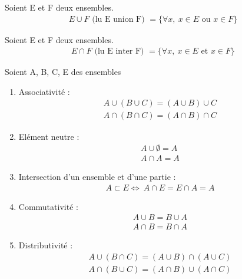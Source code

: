 \begin{graybox}
	\begin{definition}
		Soient E et F deux ensembles.
		\begin{align*}
			E \cup F \text{ (lu E union F) } = \{\forall x,\ x \in E \text{ ou } x \in F \}
		\end{align*}
	\end{definition}
\end{graybox}

\begin{graybox}
	\begin{definition}
		Soient E et F deux ensembles.
		\begin{align*}
			E \cap F \text{ (lu E inter F) } = \{\forall x,\ x \in E \text{ et } x \in F \}
		\end{align*}
	\end{definition}
\end{graybox}

\begin{graybox}
	\begin{proposition} Soient A, B, C, E des ensembles
		\begin{enumerate}
			\item Associativité :
			\begin{align*}
				A \cup (B \cup C) = (A \cup B) \cup C \\
				A \cap (B \cap C) = (A \cap B) \cap C
			\end{align*}
			\item Elément neutre : 
			\begin{align*}
				A \cup \emptyset = A \\
				A \cap A = A 
			\end{align*}
			\item Intersection d'un ensemble et d'une partie :
			\begin{align*}
				A \subset E \iff \ A \cap E = E \cap A = A
			\end{align*}
			\item Commutativité :
			\begin{align*}
				A \cup B = B \cup A \\
				A \cap B = B \cap A	
			\end{align*}
			\item Distributivité :
			\begin{align*}
				A \cup (B \cap C) = (A \cup B) \cap (A \cup C) \\
				A \cap (B \cup C) = (A \cap B) \cup (A \cap C)	
			\end{align*}
		\end{enumerate}
	\end{proposition}
\end{graybox}

